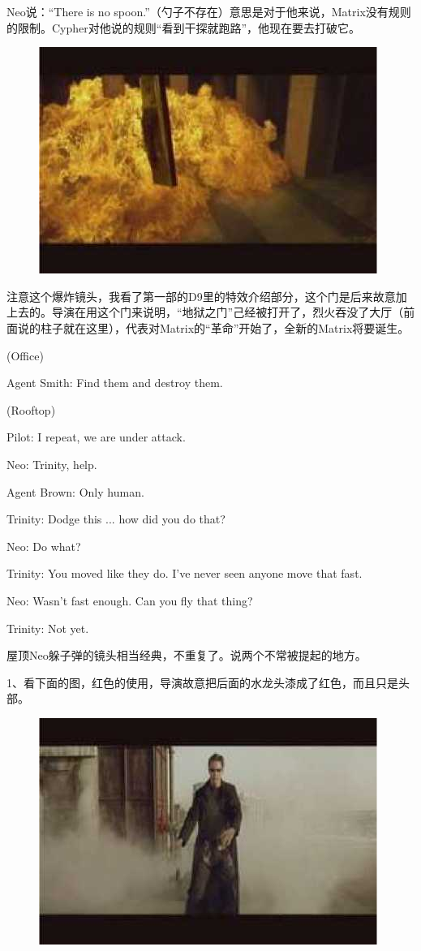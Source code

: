 \documentclass[UTF8]{ctexart}
\newenvironment{myquote}{\color{green} \setlength{\leftskip}{6em} \setlength{\rightskip}{4em} \setlength{\parindent}{-2em}}{\par}
\begin{document}
Neo说：“There is no spoon.”（勺子不存在）意思是对于他来说，Matrix没有规则的限制。Cypher对他说的规则“看到干探就跑路”，他现在要去打破它。

\begin{figure}[htb]
\centering
\includegraphics[width=0.5\linewidth]{fig/read_Matrix-65}
\end{figure}

注意这个爆炸镜头，我看了第一部的D9里的特效介绍部分，这个门是后来故意加上去的。导演在用这个门来说明，“地狱之门”己经被打开了，烈火吞没了大厅（前面说的柱子就在这里），代表对Matrix的“革命”开始了，全新的Matrix将要诞生。

\begin{myquote}
(Office)

Agent Smith: Find them and destroy them.

(Rooftop)

Pilot: I repeat, we are under attack.

Neo: Trinity, help.

Agent Brown: Only human.

Trinity: Dodge this ... how did you do that?

Neo: Do what?

Trinity: You moved like they do. I've never seen anyone move that fast.

Neo: Wasn't fast enough. Can you fly that thing?

Trinity: Not yet.
\end{myquote}

屋顶Neo躲子弹的镜头相当经典，不重复了。说两个不常被提起的地方。

1、看下面的图，红色的使用，导演故意把后面的水龙头漆成了红色，而且只是头部。

\begin{figure}[htb]
\centering
\includegraphics[width=0.5\linewidth]{fig/read_Matrix-66}
\end{figure}
\end{document}
